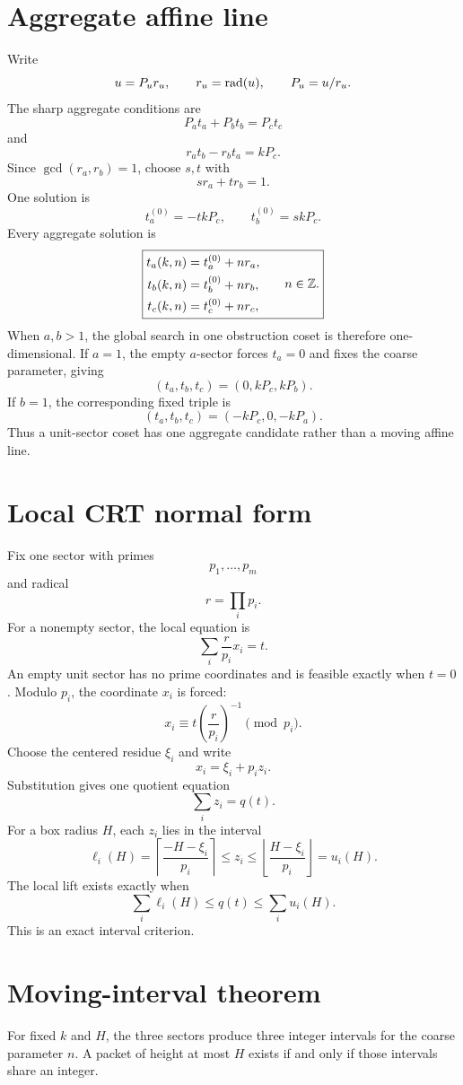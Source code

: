 \section{Aggregate affine line}
Write
\[
 u=P_ur_u,
 \qquad
 r_u=\operatorname{rad}(u),
 \qquad
 P_u=u/r_u.
\]
The sharp aggregate conditions are
\[
 P_at_a+P_bt_b=P_ct_c
\]
and
\[
 r_at_b-r_bt_a=kP_c.
\]
Since $\gcd(r_a,r_b)=1$, choose $s,t$ with
\[
 sr_a+tr_b=1.
\]
One solution is
\[
 t_a^{(0)}=-tkP_c,
 \qquad
 t_b^{(0)}=skP_c.
\]
Every aggregate solution is
\[
 \boxed{
 \begin{aligned}
 t_a(k,n)&=t_a^{(0)}+nr_a,\\
 t_b(k,n)&=t_b^{(0)}+nr_b,\\
 t_c(k,n)&=t_c^{(0)}+nr_c,
 \end{aligned}
 \qquad n\in\mathbb Z.
 }
\]
When $a,b>1$, the global search in one obstruction coset is therefore one-dimensional. If $a=1$, the empty $a$-sector forces $t_a=0$ and fixes the coarse parameter, giving
\[
 (t_a,t_b,t_c)=(0,kP_c,kP_b).
\]
If $b=1$, the corresponding fixed triple is
\[
 (t_a,t_b,t_c)=(-kP_c,0,-kP_a).
\]
Thus a unit-sector coset has one aggregate candidate rather than a moving affine line.

\section{Local CRT normal form}
Fix one sector with primes
\[
 p_1,\ldots,p_m
\]
and radical
\[
 r=\prod_i p_i.
\]
For a nonempty sector, the local equation is
\[
 \sum_i\frac r{p_i}x_i=t.
\]
An empty unit sector has no prime coordinates and is feasible exactly when $t=0$.
Modulo $p_i$, the coordinate $x_i$ is forced:
\[
 x_i
 \equiv
 t\left(\frac r{p_i}\right)^{-1}
 \pmod{p_i}.
\]
Choose the centered residue $\xi_i$ and write
\[
 x_i=\xi_i+p_i z_i.
\]
Substitution gives one quotient equation
\[
 \sum_i z_i=q(t).
\]
For a box radius $H$, each $z_i$ lies in the interval
\[
 \ell_i(H)
 =
 \left\lceil\frac{-H-\xi_i}{p_i}\right\rceil
 \le z_i\le
 \left\lfloor\frac{H-\xi_i}{p_i}\right\rfloor
 =u_i(H).
\]
The local lift exists exactly when
\[
 \boxed{
 \sum_i\ell_i(H)
 \le q(t)\le
 \sum_i u_i(H).
 }
\]
This is an exact interval criterion.

\section{Moving-interval theorem}
For fixed $k$ and $H$, the three sectors produce three integer intervals for the coarse parameter $n$. A packet of height at most $H$ exists if and only if those intervals share an integer.


